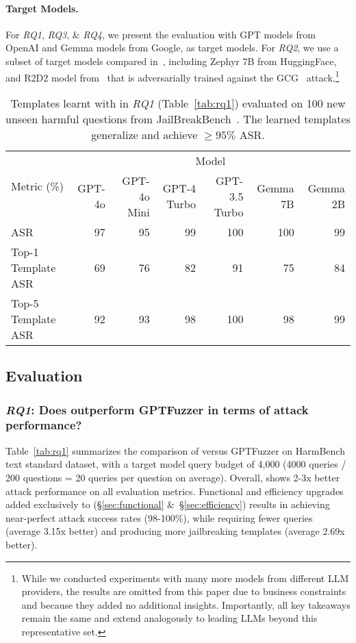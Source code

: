 \noindent \paragraph{\textbf{Target Models}.} For \textit{RQ1}, \textit{RQ3}, \& \textit{RQ4}, we present the evaluation with GPT models from OpenAI and Gemma models from Google, as target models. For \textit{RQ2}, we use a subset of target models compared in~\cite{mazeika2024harmbench}, including Zephyr 7B from HuggingFace, and R2D2 model from~\cite{mazeika2024harmbench} that is adversarially trained against the GCG~\cite{zou2023universal} attack.\footnote{While we conducted experiments with many more models from different LLM providers, the results are omitted from this paper due to business constraints and because they added no additional insights. Importantly, all key takeaways remain the same and extend analogously to leading LLMs beyond this representative set.}


\begin{table*}[tp]
\centering
\small
\begin{tabular}{l|rrrr|rr}\toprule
\multirow{2}{*}{Metric (\%)} &\multicolumn{6}{c}{Model} \\\cmidrule{2-7}
&GPT-4o &GPT-4o Mini &GPT-4 Turbo &GPT-3.5 Turbo &Gemma 7B &Gemma 2B \\\midrule
ASR &97 &95 &99 &100 &100 &99 \\\midrule
Top-1 Template ASR &69 &76 &82 &91 &75 &84 \\
Top-5 Template ASR &92 &93 &98 &100 &98 &99 \\
\bottomrule
\end{tabular}
\caption{Templates learnt with \bedrockfuzz in \textit{RQ1} (Table~\ref{tab:rq1}) evaluated on 100 new unseen harmful questions from JailBreakBench~\cite{chao2024jailbreakbench}. The learned templates generalize and achieve $\geq 95\%$ ASR.}
\label{tab:rq3}
\end{table*}

\subsection{Evaluation}
\label{sec:eval}

\subsubsection*{\textit{RQ1}: Does \bedrockfuzz outperform GPTFuzzer in terms of attack performance?}
Table~\ref{tab:rq1} summarizes the comparison of \bedrockfuzz versus GPTFuzzer on HarmBench text standard dataset, with a target model query budget of 4,000 (4000 queries / 200 questions = 20 queries per question on average). Overall, \bedrockfuzz shows 2-3x better attack performance on all evaluation metrics. Functional and efficiency upgrades added exclusively to \bedrockfuzz (\S\ref{sec:functional} \&~\S\ref{sec:efficiency}) results in \bedrockfuzz achieving near-perfect attack success rates (98-100\%), while requiring fewer queries (average 3.15x better) and producing more jailbreaking templates (average 2.69x better).

